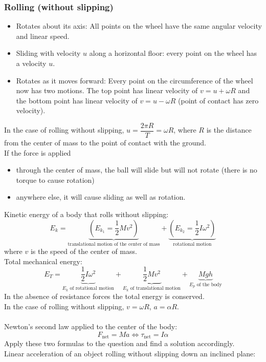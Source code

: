 \subsubsection*{Rolling (without slipping)}
\begin{itemize}
  \item Rotates about its axis: All points on the wheel have the same angular velocity and linear speed.
  \item Sliding with velocity $u$ along a horizontal floor: every point on the wheel has a velocity $u$.
  \item Rotates as it moves forward: Every point on the circumference of the wheel now has two motions. The top point has linear velocity of $v=u+\omega R$ and the bottom point has linear velocity of $v=u-\omega R$ (point of contact has zero velocity).
\end{itemize}
In the case of rolling without slipping, $u=\dfrac{2\pi R}{T}=\omega R$, where $R$ is the distance from the center of mass to the point of contact with the ground.
\\If the force is applied
\begin{itemize}
  \item through the center of mass, the ball will slide but will not rotate (there is no torque to cause rotation)
  \item anywhere else, it will cause sliding as well as rotation.
\end{itemize}
Kinetic energy of a body that rolls without slipping:
\[E_k=\underbrace{\left(E_{k_1}=\dfrac{1}{2}Mv^2\right)}_\text{translational motion of the center of mass}+\underbrace{\left(E_{k_2}=\dfrac{1}{2}I\omega^2\right)}_\text{rotational motion}\]
where $v$ is the speed of the center of mass.\\
Total mechanical energy:
\[E_T=\underbrace{\dfrac{1}{2}I\omega^2}_\text{$E_k$ of rotational motion}+\underbrace{\dfrac{1}{2}Mv^2}_\text{$E_k$ of translational motion}+\underbrace{Mgh}_\text{$E_p$ of the body}\]
In the absence of resistance forces the total energy is conserved.\\
In the case of rolling without slipping, $v=\omega R$, $a=\alpha R$.\\\\
Newton's second law applied to the center of the body:
\[F_\text{net}=Ma\Leftrightarrow\tau_\text{net}=I\alpha\]
Apply these two formulas to the question and find a solution accordingly.\\
Linear acceleration of an object rolling without slipping down an inclined plane:
